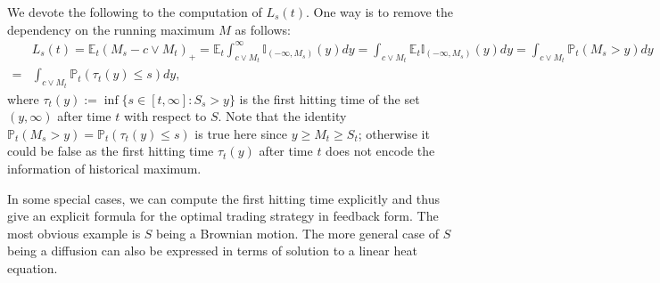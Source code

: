 \documentclass[openany,oneside]{article}
\theoremstyle{definition}
\theoremstyle{remark}
\newcommand{\E}{\mathbb{E}} %
\renewcommand{\P}{\mathbb{P}} %
\newcommand{\I}{\mathbb{I}} %
\begin{document}
We devote the following to the computation of $L_s(t)$. One way is to remove the dependency on the running maximum $M$ as follows:
\begin{align*}
& L_s(t) = \E_t(M_s-c\vee M_t)_+ = \E_t \int_{c\vee M_t}^{\infty}\I_{(-\infty,M_s)}(y) dy = \int_{c\vee M_t} \E_t \I_{(-\infty,M_s)}(y)dy = \int_{c\vee M_t} \P_t(M_s > y) dy \\
=& \int_{c\vee M_t} \P_t(\tau_t(y) \le s) dy,
\end{align*}
where $\tau_t(y):=\inf\{s\in[t,\infty] : S_s> y\}$ is the first hitting time of the set $(y,\infty)$ after time $t$ with respect to $S$. Note that the identity $\P_t(M_s > y) = \P_t(\tau_t(y)\le s)$ is true here since $y\ge M_t\ge S_t$; otherwise it could be false as the first hitting time $\tau_t(y)$ after time $t$ does not encode the information of historical maximum.

In some special cases, we can compute the first hitting time explicitly and thus give an explicit formula for the optimal trading strategy in feedback form. The most obvious example is $S$ being a Brownian motion. The more general case of $S$ being a diffusion can also be expressed in terms of solution to a linear heat equation.
\end{document}
